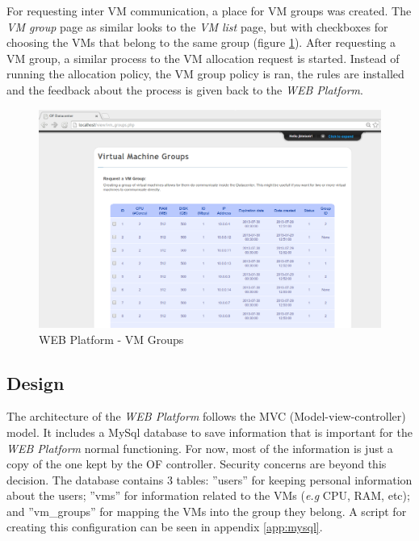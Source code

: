 \documentclass[12pt,english,oneside]{book}
\begin{document}
For requesting inter VM communication, a place for VM groups was created. The \textit{VM group} page as similar looks to the \textit{VM list} page, but with checkboxes for choosing the VMs that belong to the same group (figure \ref{fig:webplatvmgroup}).
After requesting a VM group, a similar process to the VM allocation request is started. Instead of running the allocation policy, the VM group policy is ran, the rules are installed and the feedback about the process is given back to the \textit{WEB Platform}.

\begin{figure}[h!tbp]
        \centering
        \includegraphics[width=1\textwidth]{figures/webplat_vmgroup.png}
        \caption{WEB Platform - VM Groups}
        \label{fig:webplatvmgroup}
\end{figure}

\newpage

\subsection{Design}
\hspace{0.6cm}

The architecture of the \textit{WEB Platform} follows the MVC (Model-view-controller) model.
It includes a MySql\cite{mysql} database to save information that is important for the \textit{WEB Platform} normal functioning. For now, most of the information is just a copy of the one kept by the OF controller. Security concerns are beyond this decision.
The database contains $3$ tables: ''users'' for keeping personal information about the users; ''vms'' for information related to the VMs (\textit{e.g} CPU, RAM, etc); and ''vm\_groups'' for mapping the VMs into the group they belong.
A script for creating this configuration can be seen in appendix \ref{app:mysql}.
\end{document}
